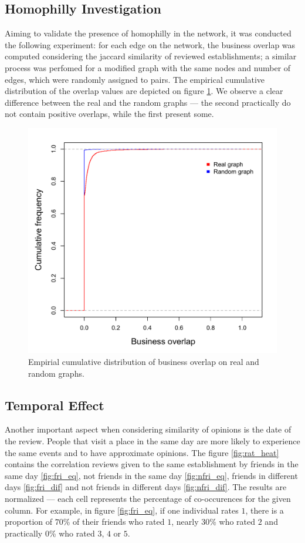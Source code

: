\documentclass[12pt]{article}
\begin{document}
\subsection{Homophilly Investigation}

Aiming to validate the presence of homophilly in the network, it was conducted
the following experiment: for each edge on the network, the business overlap was
computed considering the jaccard similarity of reviewed establishments; a
similar process was perfomed for a modified graph with the same nodes and number
of edges, which were randomly assigned to pairs. The empirical cumulative
distribution of the overlap values are depicted on figure \ref{fig:bus_olap}. We
observe a clear difference between the real and the random graphs --- the second
practically do not contain positive overlaps, while the first present some.

\begin{figure}[H]
\centering
\includegraphics[scale=0.5]{img/ecdf_bus_olap}
\caption{Empirial cumulative distribution of business overlap on real and random graphs.}
\label{fig:bus_olap}
\end{figure}


\subsection{Temporal Effect}
Another important aspect when considering similarity of opinions is the date of
the review. People that visit a place in the same day are more likely to
experience the same events and to have approximate opinions. The figure
\ref{fig:rat_heat} contains the correlation reviews given to the same
establishment by friends in the same day \ref{fig:fri_eq}, not friends in the
same day \ref{fig:nfri_eq}, friends in different days \ref{fig:fri_dif} and not
friends in different days \ref{fig:nfri_dif}. The results are normalized ---
each cell represents the percentage of co-occurences for the given column. For
example, in figure \ref{fig:fri_eq}, if one individual rates $1$, there is a
proportion of $70$\% of their friends who rated $1$, nearly $30$\% who rated $2$
and practically $0$\% who rated $3$, $4$ or $5$.
\end{document}
